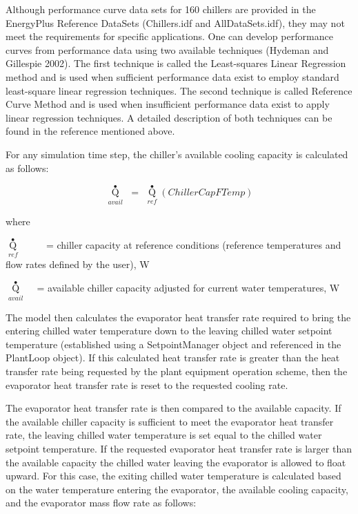 Although performance curve data sets for 160 chillers are provided in the EnergyPlus Reference DataSets (Chillers.idf and AllDataSets.idf), they may not meet the requirements for specific applications. One can develop performance curves from performance data using two available techniques (Hydeman and Gillespie 2002). The first technique is called the Least-squares Linear Regression method and is used when sufficient performance data exist to employ standard least-square linear regression techniques. The second technique is called Reference Curve Method and is used when insufficient performance data exist to apply linear regression techniques. A detailed description of both techniques can be found in the reference mentioned above.

For any simulation time step, the chiller's available cooling capacity is calculated as follows:

\begin{equation}
{\mathop Q\limits^ \bullet_{avail}}\,\, = \,\,{\mathop Q\limits^ \bullet_{ref}}\left( {ChillerCapFTemp} \right)
\end{equation}

where

\({\mathop Q\limits^ \bullet_{ref}}\) ~~~~ = chiller capacity at reference conditions (reference temperatures and flow rates defined by the user), W

\({\mathop Q\limits^ \bullet_{avail}}\) ~ = available chiller capacity adjusted for current water temperatures, W

The model then calculates the evaporator heat transfer rate required to bring the entering chilled water temperature down to the leaving chilled water setpoint temperature (established using a SetpointManager object and referenced in the PlantLoop object). If this calculated heat transfer rate is greater than the heat transfer rate being requested by the plant equipment operation scheme, then the evaporator heat transfer rate is reset to the requested cooling rate.

The evaporator heat transfer rate is then compared to the available capacity. If the available chiller capacity is sufficient to meet the evaporator heat transfer rate, the leaving chilled water temperature is set equal to the chilled water setpoint temperature. If the requested evaporator heat transfer rate is larger than the available capacity the chilled water leaving the evaporator is allowed to float upward. For this case, the exiting chilled water temperature is calculated based on the water temperature entering the evaporator, the available cooling capacity, and the evaporator mass flow rate as follows:

